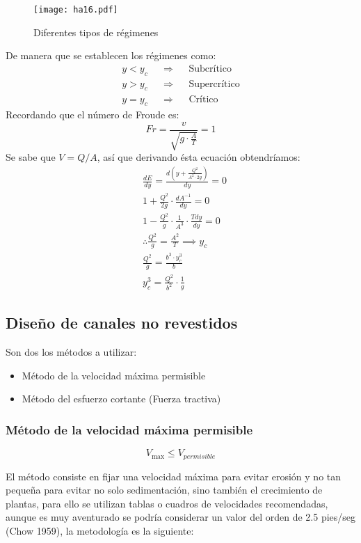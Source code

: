 \begin{figure}[h!]
\centering
  \texttt{[image: ha16.pdf]}
  \caption{Diferentes tipos de régimenes}
  \label{ha16}
\end{figure}
De manera que se establecen los régimenes como:
\begin{align*}
    y< y_c && \Rightarrow && \text{Subcrítico}\\
    y> y_c && \Rightarrow && \text{Supercrítico}\\
    y= y_c && \Rightarrow && \text{Crítico}
\end{align*}
Recordando que el número de Froude es:
\begin{equation}
    Fr = \frac{v}{\sqrt{g\cdot \frac{A}{T}}} = 1
\end{equation}
Se sabe que $V=Q/A$, así que derivando ésta ecuación obtendríamos:
\begin{align*}
    &\frac{dE}{dy}= \frac{d\left(y + \frac{Q^2}{A^2\cdot 2g}\right)}{dy} = 0\\
    &1 + \frac{Q^2}{2g}\cdot \frac{dA^{ -1}}{dy}= 0\\
    &1 - \frac{Q^2}{g}\cdot \frac{1}{A^3}\cdot \frac{Tdy}{dy}=0\\
    &\therefore \frac{Q^2}{g} = \frac{A^2}{T}\implies y_c\\
    &\frac{Q^2}{g} = \frac{b^3\cdot y^3_c}{b}\\
    &y_c^3 = \frac{Q^2}{b^2}\cdot \frac{1}{g}
\end{align*}

\subsection{Diseño de canales no revestidos}

Son dos los métodos a utilizar:
\begin{itemize}
    \item Método de la velocidad máxima permisible
    \item Método del esfuerzo cortante (Fuerza tractiva)
\end{itemize}

\subsubsection{Método de la velocidad máxima permisible}
\begin{equation}
    V_{\max }\leq V_{permisible}
\end{equation}

El método consiste en fijar una velocidad máxima para evitar erosión y no tan pequeña para evitar no solo sedimentación, sino también el crecimiento de plantas, para ello se utilizan tablas o cuadros de velocidades recomendadas, aunque es muy aventurado se podría considerar un valor del orden de 2.5 pies/seg (Chow 1959), la metodología es la siguiente:

